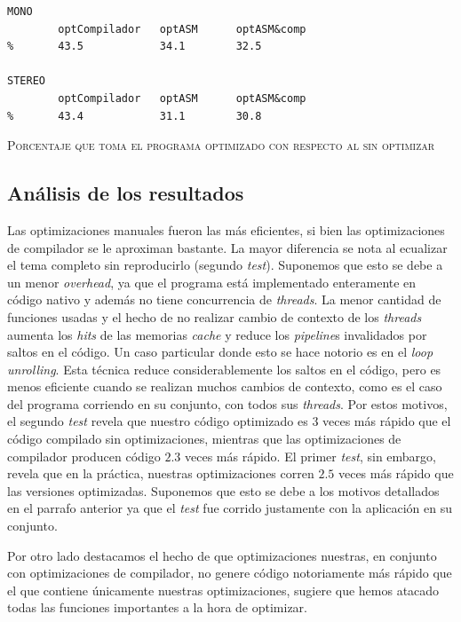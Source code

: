 \documentclass[%
    compressed,
    titlepage,
    narroweqnarray,
    inline,
    twoside,
    ]{ieee}
\begin{document}
{\small
\begin{lstlisting}
MONO
        optCompilador   optASM      optASM&comp
%       43.5            34.1        32.5

STEREO
        optCompilador   optASM      optASM&comp
%       43.4            31.1        30.8
\end{lstlisting}
}
\begin{center} \textsc{Porcentaje que toma el programa optimizado con respecto al sin optimizar} \end{center}

\subsection{An\'alisis de los resultados}

Las optimizaciones manuales fueron las m\'as eficientes, si bien las optimizaciones de compilador se le aproximan bastante.
La mayor diferencia se nota al ecualizar el tema completo sin reproducirlo (segundo \textit{test}). Suponemos que esto se debe a un menor
\textit{overhead}, ya que el programa est\'a implementado enteramente en c\'odigo nativo y adem\'as no tiene concurrencia
de \textit{threads}. La menor cantidad de funciones usadas y el hecho de no realizar cambio de contexto de los \textit{threads}
aumenta los \textit{hits} de las memorias \textit{cache} y reduce los \textit{pipeline}s invalidados por saltos en el c\'odigo.
Un caso particular donde esto se hace notorio es en el \textit{loop unrolling}. Esta t\'ecnica reduce considerablemente los saltos
en el c\'odigo, pero es menos eficiente cuando se realizan muchos cambios de contexto, como es el caso del programa corriendo
en su conjunto, con todos sus \textit{threads}.
Por estos motivos, el segundo \textit{test} revela que nuestro c\'odigo optimizado es $3$ veces m\'as r\'apido que el c\'odigo
compilado sin optimizaciones, mientras que las optimizaciones de compilador producen c\'odigo $2.3$ veces m\'as r\'apido.
El primer \textit{test}, sin embargo, revela que en la pr\'actica, nuestras optimizaciones corren $2.5$ veces m\'as r\'apido
que las versiones optimizadas. Suponemos que esto se debe a los motivos detallados en el parrafo anterior ya que el \textit{test}
fue corrido justamente con la aplicaci\'on en su conjunto.

Por otro lado destacamos el hecho de que optimizaciones nuestras, en conjunto con optimizaciones de compilador, no genere c\'odigo notoriamente m\'as
r\'apido que el que contiene \'unicamente nuestras optimizaciones, sugiere que hemos atacado todas las funciones importantes
a la hora de optimizar.
\end{document}
